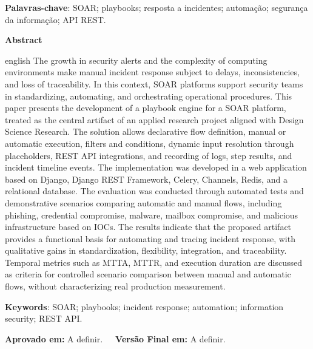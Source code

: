 \documentclass[article,a4paper,12pt,english,brazil,sumario=tradicional]{abntex2}
\begin{document}
\vspace{.4cm}
 
\noindent
\textbf{Palavras-chave}: SOAR; playbooks; resposta a incidentes; automação; segurança da informação; API REST.
 
\vspace{\onelineskip}

\begin{center}
    \textbf{Abstract}
\end{center}

\vspace{-.3cm}
\begin{hyphenrules}{english}
\noindent The growth in security alerts and the complexity of computing environments make manual incident response subject to delays, inconsistencies, and loss of traceability. In this context, SOAR platforms support security teams in standardizing, automating, and orchestrating operational procedures. This paper presents the development of a playbook engine for a SOAR platform, treated as the central artifact of an applied research project aligned with Design Science Research. The solution allows declarative flow definition, manual or automatic execution, filters and conditions, dynamic input resolution through placeholders, REST API integrations, and recording of logs, step results, and incident timeline events. The implementation was developed in a web application based on Django, Django REST Framework, Celery, Channels, Redis, and a relational database. The evaluation was conducted through automated tests and demonstrative scenarios comparing automatic and manual flows, including phishing, credential compromise, malware, mailbox compromise, and malicious infrastructure based on IOCs. The results indicate that the proposed artifact provides a functional basis for automating and tracing incident response, with qualitative gains in standardization, flexibility, integration, and traceability. Temporal metrics such as MTTA, MTTR, and execution duration are discussed as criteria for controlled scenario comparison between manual and automatic flows, without characterizing real production measurement.
\end{hyphenrules}
\vspace{.4cm}
 
\noindent \textbf{Keywords}: SOAR; playbooks; incident response; automation; information security; REST API.

\vspace{.4cm}

\noindent \textbf{Aprovado em:} A definir.~~~\textbf{Versão Final em:} A definir.
\end{document}
